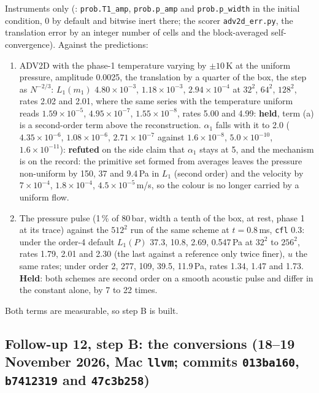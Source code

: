 \documentclass[11pt,a4paper]{article}
\newcommand{\code}[1]{\texttt{\small #1}}
\begin{document}
Instruments only (: \code{prob.T1\_amp}, \code{prob.p\_amp}
and \code{prob.p\_width} in the initial condition, 0 by default and bitwise
inert there; the scorer \code{adv2d\_err.py}, the translation error by
an integer number of cells and the block-averaged self-convergence).
Against the predictions:
\begin{enumerate}[nosep]
\item ADV2D with the phase-1 temperature varying by $\pm10$\,K at the
      uniform pressure, amplitude 0.0025, the translation by a quarter
      of the box, the step as $N^{-2/3}$: $L_1(m_1)$
      $4.80\times10^{-3}$, $1.18\times10^{-3}$, $2.94\times10^{-4}$ at
      $32^2$, $64^2$, $128^2$, rates 2.02 and 2.01, where the same series
      with the temperature uniform reads $1.59\times10^{-5}$,
      $4.95\times10^{-7}$, $1.55\times10^{-8}$, rates 5.00 and 4.99:
      \textbf{held}, term (a) is a second-order term above the
      reconstruction.  $\alpha_1$ falls with it to 2.0 ($4.35\times10^{-6}$,
      $1.08\times10^{-6}$, $2.71\times10^{-7}$ against $1.6\times10^{-8}$,
      $5.0\times10^{-10}$, $1.6\times10^{-11}$): \textbf{refuted} on the
      side claim that $\alpha_1$ stays at 5, and the mechanism is on the
      record: the primitive set formed from averages leaves the pressure
      non-uniform by 150, 37 and 9.4\,Pa in $L_1$ (second order) and the
      velocity by $7\times10^{-4}$, $1.8\times10^{-4}$, $4.5\times10^{-5}$\,m/s,
      so the colour is no longer carried by a uniform flow.
\item The pressure pulse (1\,\% of 80\,bar, width a tenth of the box, at
      rest, phase 1 at its trace) against the $512^2$ run of the same
      scheme at $t = 0.8$\,ms, \code{cfl} 0.3: under the order-4 default
      $L_1(P)$ 37.3, 10.8, 2.69, 0.547\,Pa at $32^2$ to $256^2$, rates
      1.79, 2.01 and 2.30 (the last against a reference only twice
      finer), $u$ the same rates; under order 2, 277, 109, 39.5,
      11.9\,Pa, rates 1.34, 1.47 and 1.73.  \textbf{Held}: both schemes
      are second order on a smooth acoustic pulse and differ in the
      constant alone, by 7 to 22 times.
\end{enumerate}
Both terms are measurable, so step B is built.


\subsection{Follow-up 12, step B: the conversions (18--19 November 2026, Mac \code{llvm}; commits \code{013ba160}, \code{b7412319} and \code{47c3b258})}
\label{sec:fu12b}
\end{document}
